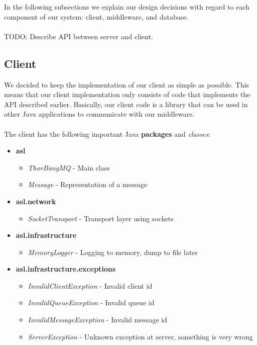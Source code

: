 \documentclass{article}
\begin{document}
        \noindent In the following subsections we explain our design decisions with regard to each component of our system: client, middleware, and database.\\
        \\
        TODO: Describe API between server and client.


        \subsection{Client}
            We decided to keep the implementation of our client as simple as possible. This means that our client implementation only consists of code that implements the API described earlier. Basically, our client code is a library that can be used in other Java applications to communicate with our middleware.\\
            \\
            The client has the following important Java \textbf{packages} and \textit{classes}:
            \begin{itemize}
                \item \textbf{asl}
                    \begin{itemize}
                        \item \textit{ThorBangMQ} - Main class
                        \item \textit{Message} - Representation of a message
                    \end{itemize}
                \item \textbf{asl.network}
                \begin{itemize}
                     \item \textit{SocketTransport} - Transport layer using sockets
                 \end{itemize} 
                \item \textbf{asl.infrastructure}
                 \begin{itemize}
                    \item \textit{MemoryLogger} - Logging to memory, dump to file later
                \end{itemize}
                \item \textbf{asl.infrastructure.exceptions}
                \begin{itemize}
                    \item \textit{InvalidClientException} - Invalid client id
                    \item \textit{InvalidQueueException} - Invalid queue id
                    \item \textit{InvalidMessageException} - Invalid message id
                    \item \textit{ServerException} - Unknown exception at server, something is very wrong
                \end{itemize}
            \end{itemize}
\end{document}
